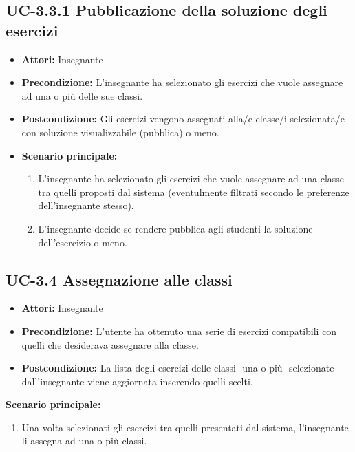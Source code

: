 \subsection{UC-3.3.1 Pubblicazione della soluzione degli esercizi}
\begin{itemize}
	\item \textbf{Attori:} Insegnante
	\item \textbf{Precondizione:} L'insegnante ha selezionato gli esercizi che vuole assegnare ad una o più delle sue classi.
	\item \textbf{Postcondizione:} Gli esercizi vengono assegnati alla/e classe/i selezionata/e con soluzione visualizzabile (pubblica) o meno.
	\item \textbf{Scenario principale:} 
	\begin{enumerate}
		\item L'insegnante ha selezionato gli esercizi che vuole assegnare ad una classe tra quelli proposti dal sistema (eventulmente filtrati secondo le preferenze dell'insegnante stesso).
		\item L'insegnante decide se rendere pubblica agli studenti la soluzione dell'esercizio o meno.
	\end{enumerate}
\end{itemize}

\subsection{UC-3.4 Assegnazione alle classi}
\begin{itemize}
		\item \textbf{Attori: }Insegnante
		\item \textbf{Precondizione: }L'utente ha ottenuto una serie di esercizi compatibili con quelli che desiderava assegnare alla classe.
		\item \textbf{Postcondizione: }La lista degli esercizi delle classi -una o più- selezionate dall'insegnante viene aggiornata inserendo quelli scelti.
\end{itemize}
		\item \textbf{Scenario principale: }
		\begin{enumerate}
			\item Una volta selezionati gli esercizi tra quelli presentati dal sistema, l'insegnante li assegna ad una o più classi.
		\end{enumerate} 
